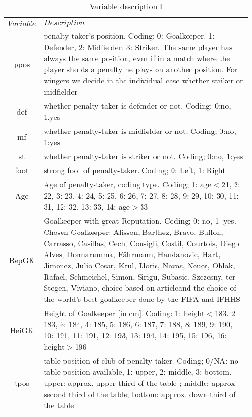 \documentclass[12pt,dvipsnames]{article}%
\begin{document}
\begin{table}[h]
\caption{Variable description \small{I}}
\centering
\begin{tabular}{ c | p{13cm}  }
    $Variable$ & $Description$   \\
   \hline
	
ppos & penalty-taker's position. Coding; 0: Goalkeeper, 1: Defender, 2: Midfielder, 3: Striker. The same player has always the same position, even if in a match where the player shoots a penalty he plays on another position. For wingers we decide in the individual case whether striker or midfielder  \\

def & whether penalty-taker is defender or not. Coding; 0:no, 1:yes \\

mf & whether penalty-taker is midfielder or not. Coding; 0:no, 1:yes \\

st & whether penalty-taker is striker or not. Coding; 0:no, 1:yes \\

foot & strong foot of penalty-taker. Coding; 0: Left, 1: Right  \\

Age & Age of penalty-taker, coding type. Coding; 1: age$<$21, 2: 22, 3: 23, 4: 24, 5: 25, 6: 26, 7: 27, 8: 28, 9: 29, 10: 30, 11: 31, 12: 32,  13: 33, 14: age$>$33  \\

RepGK & Goalkeeper with great Reputation. Coding; 0: no, 1: yes. Chosen Goalkeeper:  Alisson, Barthez, Bravo, Buffon, Carrasso, Casillas, Cech, Consigli, Costil,  Courtois, Diego Alves, Donnarumma, F\"ahrmann,  Handanovic, Hart, Jimenez,  Julio Cesar, Krul, Lloris, Navas, Neuer, Oblak, Rafael, Schmeichel, Simon, Sirigu, Subasic, Szczesny, ter Stegen, Viviano, choice based on article\footnotemark[5] and the choice of the world's best goalkeeper done by the FIFA and IFHHS  \\
 
HeiGK & Height of Goalkeeper [in cm]. Coding; 1: height$<$183, 2: 183, 3: 184, 4: 185,  5: 186, 6: 187, 7: 188, 8: 189, 9: 190, 10: 191, 11: 191, 12: 193, 13: 194, 14: 195, 15: 196, 16: height$>$196  \\

tpos & table position of club of penalty-taker. Coding; 0/NA: no table position available, 1: upper, 2: middle, 3: bottom. upper: approx. upper third of the table ; middle: approx. second third of the table; bottom: approx. down third of the table \\


\end{tabular}
\end{table}
\end{document}
